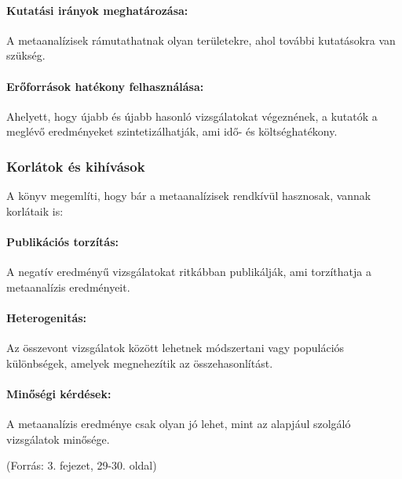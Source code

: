 \documentclass[a4paper,12pt]{article}
\begin{document}
    \paragraph{Kutatási irányok meghatározása:}
    A metaanalízisek rámutathatnak olyan területekre, ahol további kutatásokra van szükség.

    \paragraph{Erőforrások hatékony felhasználása:}
    Ahelyett, hogy újabb és újabb hasonló vizsgálatokat végeznének, a kutatók a meglévő eredményeket szintetizálhatják, ami idő- és költséghatékony.

    \subsubsection{Korlátok és kihívások}
    A könyv megemlíti, hogy bár a metaanalízisek rendkívül hasznosak, vannak korlátaik is:

    \paragraph{Publikációs torzítás:}
    A negatív eredményű vizsgálatokat ritkábban publikálják, ami torzíthatja a metaanalízis eredményeit.

    \paragraph{Heterogenitás:}
    Az összevont vizsgálatok között lehetnek módszertani vagy populációs különbségek, amelyek megnehezítik az összehasonlítást.

    \paragraph{Minőségi kérdések:}
    A metaanalízis eredménye csak olyan jó lehet, mint az alapjául szolgáló vizsgálatok minősége.

    (Forrás: 3. fejezet, 29-30. oldal)
\end{document}
